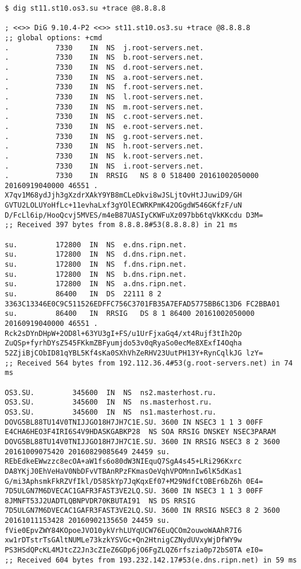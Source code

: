 \documentclass[a4paper,11pt]{article}
\begin{document}
\begin{lstlisting}[caption="Checking zone st11.st10.os3.su"]
$ dig st11.st10.os3.su +trace @8.8.8.8

; <<>> DiG 9.10.4-P2 <<>> st11.st10.os3.su +trace @8.8.8.8
;; global options: +cmd
.           7330    IN  NS  j.root-servers.net.
.           7330    IN  NS  b.root-servers.net.
.           7330    IN  NS  d.root-servers.net.
.           7330    IN  NS  a.root-servers.net.
.           7330    IN  NS  f.root-servers.net.
.           7330    IN  NS  l.root-servers.net.
.           7330    IN  NS  m.root-servers.net.
.           7330    IN  NS  c.root-servers.net.
.           7330    IN  NS  e.root-servers.net.
.           7330    IN  NS  g.root-servers.net.
.           7330    IN  NS  h.root-servers.net.
.           7330    IN  NS  k.root-servers.net.
.           7330    IN  NS  i.root-servers.net.
.           7330    IN  RRSIG   NS 8 0 518400 20161002050000 20160919040000 46551 . X7qv1M68ydJjh3gXzdrXAkY9YB8mCLeDkvi8wJSLjtOvHtJJuwiD9/GH GVTU2LOLUYoHfLc+11evhaLxf3gYOlECWRKPmK42OGgdW546GKfzF/uN D/FcLl6ip/HooQcvj5MVES/m4eB87UASIyCKWFuXz097bb6tqVkKKcdu D3M=
;; Received 397 bytes from 8.8.8.8#53(8.8.8.8) in 21 ms

su.         172800  IN  NS  e.dns.ripn.net.
su.         172800  IN  NS  d.dns.ripn.net.
su.         172800  IN  NS  f.dns.ripn.net.
su.         172800  IN  NS  b.dns.ripn.net.
su.         172800  IN  NS  a.dns.ripn.net.
su.         86400   IN  DS  22111 8 2 3363C13346E0C9C511526EDFFC756C3701FB35A7EFAD5775BB6C13D6 FC2BBA01
su.         86400   IN  RRSIG   DS 8 1 86400 20161002050000 20160919040000 46551 . Rck2sDYnDHpW+2OD8l+63YU3gI+FS/u1UrFjxaGq4/xt4Rujf3tIh2Op ZuQSp+fyrhDYsZ545FKkmZBFyumjdo53v0qRyaSo0ecMe8XExfI4Oqha 52ZjiBjCObID81qYBL5Kf4sKa0SXhVhZeRHV23UutPH13Y+RynCqlkJG lzY=
;; Received 564 bytes from 192.112.36.4#53(g.root-servers.net) in 74 ms

OS3.SU.         345600  IN  NS  ns2.masterhost.ru.
OS3.SU.         345600  IN  NS  ns.masterhost.ru.
OS3.SU.         345600  IN  NS  ns1.masterhost.ru.
DOVG5BL88TU14V0TNIJJGO18H7JH7C1E.SU. 3600 IN NSEC3 1 1 3 00FF E4CHA6HEO3F4IRI6S4V9HDASKGABKP28  NS SOA RRSIG DNSKEY NSEC3PARAM
DOVG5BL88TU14V0TNIJJGO18H7JH7C1E.SU. 3600 IN RRSIG NSEC3 8 2 3600 20161009075420 20160829085649 24459 su. REbEdkeEWwzzc8ecOA+aW1fs6o80dW3NIEquQ7SgA4s45+LRi296Kxrc DA8YKjJ0EhVeHaV0NbDFvVTBAnRPzFKmasOeVqhVPOMnnIw6lK5dKas1 G/mi3AphsmkFkRZVfIkl/D58SkYp7JqKqxEf07+M29NdfCtOBEr6bZ6h 0E4=
7D5ULGN7M6DVECAC1GAFR3FAST3VE2LQ.SU. 3600 IN NSEC3 1 1 3 00FF 8JMNFT53J2UADTLQBNPVDR70KBUTAI91  NS DS RRSIG
7D5ULGN7M6DVECAC1GAFR3FAST3VE2LQ.SU. 3600 IN RRSIG NSEC3 8 2 3600 20161011153428 20160902135650 24459 su. fVie0EpvZWY84KOpoeJVO10ykVrhLUYqUCW76EuQCOm2ouwoWAAhR7I6 xw1rDTstrTsGAltNUMLe73kzkYSVGc+Qn2HtnigCZNydUVxyWjDfWY9w PS3HSdQPcKL4MJtcZ2Jn3cZIeZ6GDp6jO6FgZLQZ6rfszia0p72bS0TA eI0=
;; Received 604 bytes from 193.232.142.17#53(e.dns.ripn.net) in 59 ms


\end{lstlisting}
\end{document}
